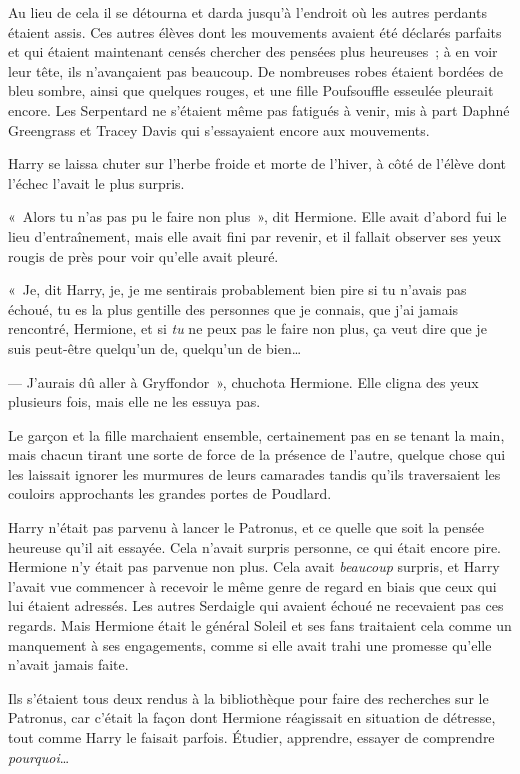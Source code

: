 Au lieu de cela il se détourna et darda jusqu'à l'endroit où les autres perdants étaient assis. Ces autres élèves dont les mouvements avaient été déclarés parfaits et qui étaient maintenant censés chercher des pensées plus heureuses~; à en voir leur tête, ils n'avançaient pas beaucoup. De nombreuses robes étaient bordées de bleu sombre, ainsi que quelques rouges, et une fille Poufsouffle esseulée pleurait encore. Les Serpentard ne s'étaient même pas fatigués à venir, mis à part Daphné Greengrass et Tracey Davis qui s'essayaient encore aux mouvements.

Harry se laissa chuter sur l'herbe froide et morte de l'hiver, à côté de l'élève dont l'échec l'avait le plus surpris.

«~Alors tu n'as pas pu le faire non plus~», dit Hermione. Elle avait d'abord fui le lieu d'entraînement, mais elle avait fini par revenir, et il fallait observer ses yeux rougis de près pour voir qu'elle avait pleuré.

«~Je, dit Harry, je, je me sentirais probablement bien pire si tu n'avais pas échoué, tu es la plus gentille des personnes que je connais, que j'ai jamais rencontré, Hermione, et si \emph{tu} ne peux pas le faire non plus, ça veut dire que je suis peut-être quelqu'un de, quelqu'un de bien…

--- J'aurais dû aller à Gryffondor~», chuchota Hermione. Elle cligna des yeux plusieurs fois, mais elle ne les essuya pas.

\later

Le garçon et la fille marchaient ensemble, certainement pas en se tenant la main, mais chacun tirant une sorte de force de la présence de l'autre, quelque chose qui les laissait ignorer les murmures de leurs camarades tandis qu'ils traversaient les couloirs approchants les grandes portes de Poudlard.

Harry n'était pas parvenu à lancer le Patronus, et ce quelle que soit la pensée heureuse qu'il ait essayée. Cela n'avait surpris personne, ce qui était encore pire. Hermione n'y était pas parvenue non plus. Cela avait \emph{beaucoup} surpris, et Harry l'avait vue commencer à recevoir le même genre de regard en biais que ceux qui lui étaient adressés. Les autres Serdaigle qui avaient échoué ne recevaient pas ces regards. Mais Hermione était le général Soleil et ses fans traitaient cela comme un manquement à ses engagements, comme si elle avait trahi une promesse qu'elle n'avait jamais faite.

Ils s'étaient tous deux rendus à la bibliothèque pour faire des recherches sur le Patronus, car c'était la façon dont Hermione réagissait en situation de détresse, tout comme Harry le faisait parfois. Étudier, apprendre, essayer de comprendre \emph{pourquoi}…

